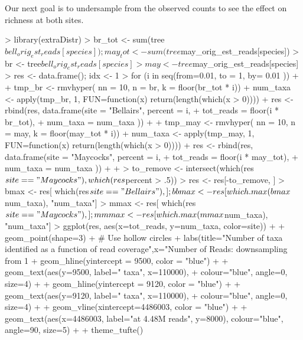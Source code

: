 \documentclass{article}
\begin{document}
Our next goal is to undersample from the observed counts to see the effect on richness
at both sites.
\begin{Schunk}
\begin{Sinput}
> library(extraDistr)
> br_tot <- sum(tree$bell_orig_est_reads[species]); may_tot <-  sum(tree$may_orig_est_reads[species])
> br <- tree$bell_orig_est_reads[species]
> may <- tree$may_orig_est_reads[species]
> res <- data.frame(); idx <- 1
> for (i in seq(from=0.01, to = 1, by= 0.01 )) {
+   
+   tmp_br <- rmvhyper( nn = 10, n = br,   k = floor(br_tot * i))
+   num_taxa <- apply(tmp_br, 1, FUN=function(x) {return(length(which(x > 0)))})
+   res <- rbind(res,  data.frame(site = "Bellairs", percent = i, 
+                             tot_reads = floor(i * br_tot),
+                             num_taxa  = num_taxa ))
+   
+   tmp_may <- rmvhyper( nn = 10, n = may,   k = floor(may_tot * i))
+   num_taxa <- apply(tmp_may, 1, FUN=function(x) {return(length(which(x > 0)))})
+   res <- rbind(res,  data.frame(site = "Maycocks", percent = i, 
+                           tot_reads = floor(i * may_tot),
+                           num_taxa  = num_taxa ))
+   
+ }
> to_remove <- intersect(which(res$site == "Maycocks"), which(res$percent  > .5))
> res <- res[-to_remove, ]
> bmax <- res[ which(res$site == "Bellairs"), ]; bbmax <- res[which.max(bmax$num_taxa), "num_taxa"]
> mmax <- res[ which(res$site == "Maycocks"), ]; mmmax <- res[which.max(mmax$num_taxa), "num_taxa"]
> ggplot(res, aes(x=tot_reads, y=num_taxa, color=site)) +
+   geom_point(shape=3) +    # Use hollow circles
+   labs(title="Number of taxa identified as a function of read coverage",x="Number of Reads: downsampling from 1% to 50% of data", y = "Number of Taxa")+
+   geom_hline(yintercept = 9500, color = "blue") +
+   geom_text(aes(y=9500, label=" taxa", x=110000), 
+             colour="blue", angle=0, size=4) +
+   geom_hline(yintercept = 9120, color = "blue") +
+   geom_text(aes(y=9120, label=" taxa", x=110000), 
+             colour="blue", angle=0, size=4) +
+   geom_vline(xintercept=4486003, color = "blue") +
+   geom_text(aes(x=4486003, label="\ntruncated at 4.48M reads", y=8000), colour="blue", angle=90, size=5) +
+   theme_tufte()
\end{Sinput}
\end{Schunk}
\end{document}
